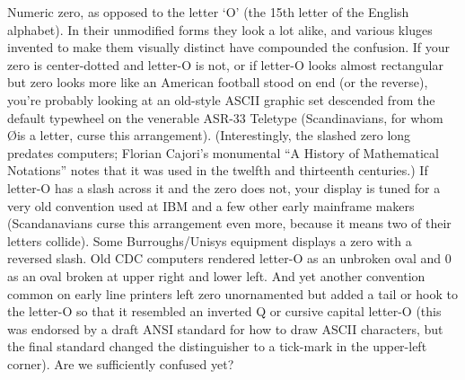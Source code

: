 
Numeric zero, as opposed to the letter `O' (the 15th letter of the
English alphabet). In their unmodified forms they look a lot alike, and
various kluges invented to make them visually distinct have compounded
the confusion. If your zero is center-dotted and letter-O is not, or if
letter-O looks almost rectangular but zero looks more like an American
football stood on end (or the reverse), you're probably looking at an
old-style ASCII graphic set descended from the default typewheel on the
venerable ASR-33 Teletype (Scandinavians, for whom \O is a letter, curse
this arrangement). (Interestingly, the slashed zero long predates
computers; Florian Cajori's monumental ``A History of Mathematical
Notations'' notes that it was used in the twelfth and thirteenth
centuries.) If letter-O has a slash across it and the zero does not,
your display is tuned for a very old convention used at IBM and a few
other early mainframe makers (Scandanavians curse this arrangement even
more, because it means two of their letters collide). Some
Burroughs/Unisys equipment displays a zero with a reversed slash. Old
CDC computers rendered letter-O as an unbroken oval and 0 as
an oval broken at upper right and lower left. And yet another convention
common on early line printers left zero unornamented but added a tail or
hook to the letter-O so that it resembled an inverted Q or cursive
capital letter-O (this was endorsed by a draft ANSI standard for how to
draw ASCII characters, but the final standard changed the distinguisher
to a tick-mark in the upper-left corner). Are we sufficiently confused
yet?


